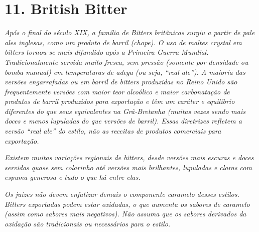 \section*{11. British Bitter}
\textit{Após o final do século XIX, a família de Bitters britânicas surgiu a partir de pale ales inglesas, como um produto de barril (chope). O uso de maltes crystal em bitters tornou-se mais difundido após a Primeira Guerra Mundial. Tradicionalmente servida muito fresca, sem pressão (somente por densidade ou bomba manual) em temperaturas de adega (ou seja, “real ale”). A maioria das versões engarrafadas ou em barril de bitters produzidas no Reino Unido são frequentemente versões com maior teor alcoólico e maior carbonatação de produtos de barril produzidos para exportação e têm um caráter e equilíbrio diferentes do que seus equivalentes na Grã-Bretanha (muitas vezes sendo mais doces e menos lupuladas do que versões de barril). Essas diretrizes refletem a versão “real ale” do estilo, não as receitas de produtos comerciais para exportação.}

\textit{Existem muitas variações regionais de bitters, desde versões mais escuras e doces servidas quase sem colarinho até versões mais brilhantes, lupuladas e claras com espuma generosa e tudo o que há entre elas.}

\textit{Os juízes não devem enfatizar demais o componente caramelo desses estilos. Bitters exportadas podem estar oxidadas, o que aumenta os sabores de caramelo (assim como sabores mais negativos). Não assuma que os sabores derivados da oxidação são tradicionais ou necessários para o estilo.}